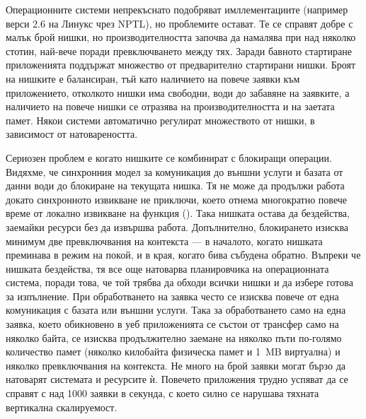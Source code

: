 Операционните системи непрекъснато подобряват имллементациите (например верси 2.6 на Линукс чрез NPTL), но проблемите остават. Те се справят добре с малък брой нишки, но производителността започва да намалява при над няколко стотин, най-вече поради превключването между тях. Заради бавното стартиране приложенията поддържат множество от предварително стартирани нишки. Броят на нишките е балансиран, тъй като наличието на повече заявки към приложението, отколкото нишки има свободни, води до забавяне на заявките, а наличието на повече нишки се отразява на производителността и на заетата памет. Някои системи автоматично регулират множеството от нишки, в зависимост от натовареността.

Сериозен проблем е когато нишките се комбинират с блокиращи операции. Видяхме, че синхронния модел за комуникация до външни услуги и базата от данни води до блокиране на текущата нишка. Тя не може да продължи работа докато синхронното извикване не приключи, което отнема многократно повече време от локално извикване на функция (). Така нишката остава да бездейства, заемайки ресурси без да извършва работа. Допълнително, блокирането изисква минимум две превключвания на контекста — в началото, когато нишката преминава в режим на покой, и в края, когато бива събудена обратно. Въпреки че нишката бездейства, тя все още натоварва планировчика на операционната система, поради това, че той трябва да обходи всички нишки и да избере готова за изпълнение. При обработването на заявка често се изисква повече от една комуникация с базата или външни услуги. Така за обработването само на една заявка, което обикновено в уеб приложенията се състои от трансфер само на няколко байта, се изисква продължително заемане на няколко пъти по-голямо количество памет (няколко килобайта физическа памет и 1~MB виртуална) и няколко превключвания на контекста. Не много на брой заявки могат бързо да натоварят системата и ресурсите ѝ. Повечето приложения трудно успяват да се справят с над 1000 заявки в секунда, с което силно се нарушава тяхната вертикална скалируемост.

